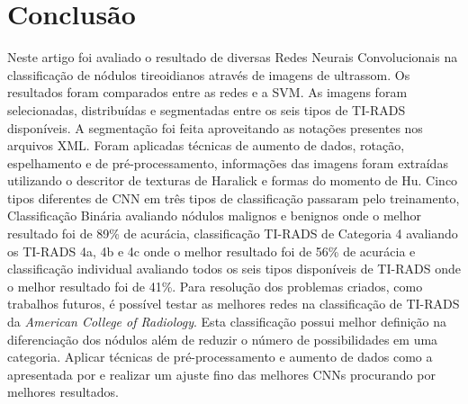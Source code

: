 \documentclass[12pt]{article}
\begin{document}
\section{Conclusão}
Neste artigo foi avaliado o resultado de diversas Redes Neurais Convolucionais na classificação de nódulos tireoidianos através de imagens de ultrassom. Os resultados foram comparados entre as redes e a SVM. As imagens foram selecionadas, distribuídas e segmentadas entre os seis tipos de TI-RADS disponíveis. A segmentação foi feita aproveitando as notações presentes nos arquivos XML. Foram aplicadas técnicas de aumento de dados, rotação, espelhamento e de pré-processamento, informações das imagens foram extraídas utilizando o descritor de texturas de Haralick e formas do momento de Hu. Cinco tipos diferentes de CNN em três tipos de classificação passaram pelo treinamento, Classificação Binária avaliando nódulos malignos e benignos onde o melhor resultado foi de 89\% de acurácia, classificação TI-RADS de Categoria 4 avaliando os TI-RADS 4a, 4b e 4c onde o melhor resultado foi de 56\% de acurácia e classificação individual avaliando todos os seis tipos disponíveis de TI-RADS onde o melhor resultado foi de 41\%. Para resolução dos problemas criados, como trabalhos futuros, é possível testar as melhores redes na classificação de TI-RADS da \textit{American College of Radiology}. Esta classificação possui melhor definição na diferenciação dos nódulos além de reduzir o número de possibilidades em uma categoria. Aplicar técnicas de pré-processamento e aumento de dados como a apresentada por \cite{ChiJ} e realizar um ajuste fino das melhores CNNs procurando por melhores resultados.



\end{document}
